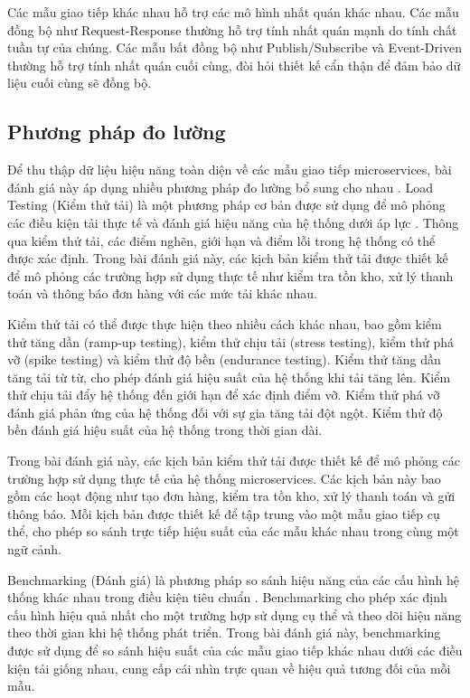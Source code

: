 Các mẫu giao tiếp khác nhau hỗ trợ các mô hình nhất quán khác nhau. Các mẫu đồng bộ như Request-Response thường hỗ trợ tính nhất quán mạnh do tính chất tuần tự của chúng. Các mẫu bất đồng bộ như Publish/Subscribe và Event-Driven thường hỗ trợ tính nhất quán cuối cùng, đòi hỏi thiết kế cẩn thận để đảm bảo dữ liệu cuối cùng sẽ đồng bộ.

\subsection{Phương pháp đo lường}
Để thu thập dữ liệu hiệu năng toàn diện về các mẫu giao tiếp microservices, bài đánh giá này áp dụng nhiều phương pháp đo lường bổ sung cho nhau \cite{newman2015}. Load Testing (Kiểm thử tải) là một phương pháp cơ bản được sử dụng để mô phỏng các điều kiện tải thực tế và đánh giá hiệu năng của hệ thống dưới áp lực \cite{jun2018}. Thông qua kiểm thử tải, các điểm nghẽn, giới hạn và điểm lỗi trong hệ thống có thể được xác định. Trong bài đánh giá này, các kịch bản kiểm thử tải được thiết kế để mô phỏng các trường hợp sử dụng thực tế như kiểm tra tồn kho, xử lý thanh toán và thông báo đơn hàng với các mức tải khác nhau.

Kiểm thử tải có thể được thực hiện theo nhiều cách khác nhau, bao gồm kiểm thử tăng dần (ramp-up testing), kiểm thử chịu tải (stress testing), kiểm thử phá vỡ (spike testing) và kiểm thử độ bền (endurance testing). Kiểm thử tăng dần tăng tải từ từ, cho phép đánh giá hiệu suất của hệ thống khi tải tăng lên. Kiểm thử chịu tải đẩy hệ thống đến giới hạn để xác định điểm vỡ. Kiểm thử phá vỡ đánh giá phản ứng của hệ thống đối với sự gia tăng tải đột ngột. Kiểm thử độ bền đánh giá hiệu suất của hệ thống trong thời gian dài.

Trong bài đánh giá này, các kịch bản kiểm thử tải được thiết kế để mô phỏng các trường hợp sử dụng thực tế của hệ thống microservices. Các kịch bản này bao gồm các hoạt động như tạo đơn hàng, kiểm tra tồn kho, xử lý thanh toán và gửi thông báo. Mỗi kịch bản được thiết kế để tập trung vào một mẫu giao tiếp cụ thể, cho phép so sánh trực tiếp hiệu suất của các mẫu khác nhau trong cùng một ngữ cảnh.

Benchmarking (Đánh giá) là phương pháp so sánh hiệu năng của các cấu hình hệ thống khác nhau trong điều kiện tiêu chuẩn \cite{richardson2019}. Benchmarking cho phép xác định cấu hình hiệu quả nhất cho một trường hợp sử dụng cụ thể và theo dõi hiệu năng theo thời gian khi hệ thống phát triển. Trong bài đánh giá này, benchmarking được sử dụng để so sánh hiệu suất của các mẫu giao tiếp khác nhau dưới các điều kiện tải giống nhau, cung cấp cái nhìn trực quan về hiệu quả tương đối của mỗi mẫu.

